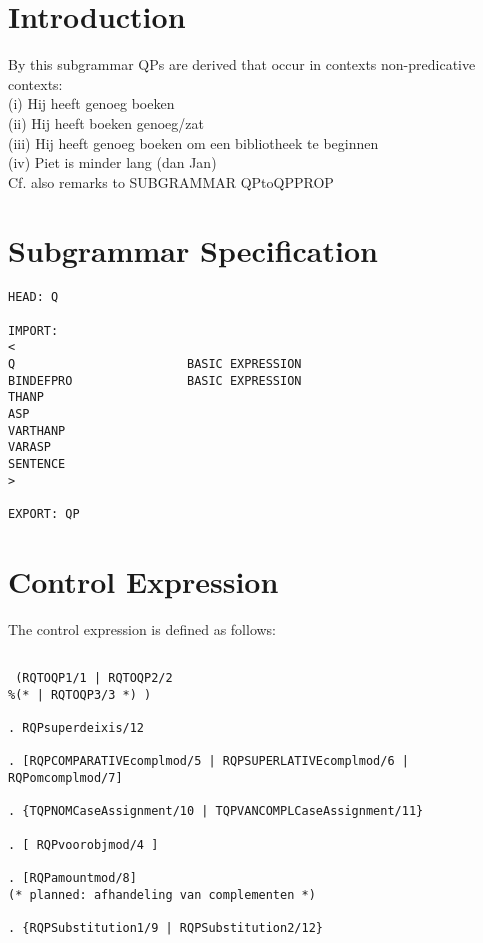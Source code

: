



   \RosSupersedes{}
   \MakeRosTitle
%
%



\section{Introduction}
By this subgrammar QPs  are derived 
that occur in 
contexts 
non-predicative contexts:\\

(i)   Hij heeft genoeg boeken\\
(ii)  Hij heeft boeken genoeg/zat\\
(iii) Hij heeft genoeg boeken om een bibliotheek te beginnen\\
(iv)  Piet is minder lang (dan Jan) \\

Cf. also remarks to SUBGRAMMAR QPtoQPPROP

\section{Subgrammar Specification}

\begin{verbatim}
HEAD: Q

IMPORT:
<
Q                        BASIC EXPRESSION
BINDEFPRO                BASIC EXPRESSION
THANP
ASP
VARTHANP
VARASP
SENTENCE
>

EXPORT: QP
\end{verbatim}

\section{Control Expression}

The control expression is defined as follows:
\begin{verbatim}

 (RQTOQP1/1 | RQTOQP2/2 
%(* | RQTOQP3/3 *) )

. RQPsuperdeixis/12

. [RQPCOMPARATIVEcomplmod/5 | RQPSUPERLATIVEcomplmod/6 | RQPomcomplmod/7]

. {TQPNOMCaseAssignment/10 | TQPVANCOMPLCaseAssignment/11}

. [ RQPvoorobjmod/4 ]

. [RQPamountmod/8]
(* planned: afhandeling van complementen *)

. {RQPSubstitution1/9 | RQPSubstitution2/12} 
\end{verbatim}


